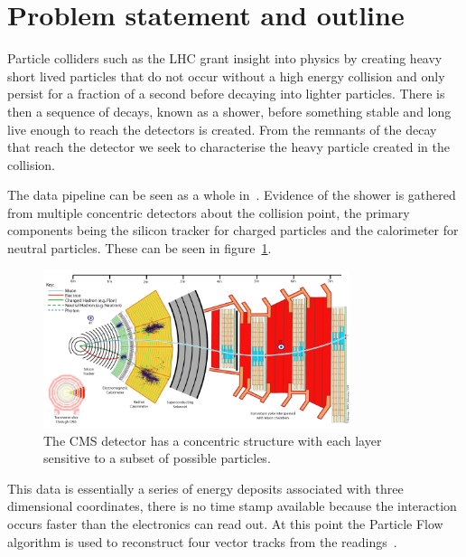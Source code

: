 \section{Problem statement and outline}
Particle colliders such as the LHC grant insight into physics by
creating heavy short lived particles that do not occur without a high energy collision
and only persist for a fraction of a second before decaying into lighter particles.
There is then a sequence of decays, known as a shower, before something
stable and long live enough to reach the detectors is created.
From the remnants of the decay that reach the detector we seek
to characterise the heavy particle created in the collision.

The data pipeline can be seen as a whole in~\cite{Stoye_DeepCMS2018, Schramm:2291608}.
Evidence of the shower is gathered from multiple concentric detectors about the collision point, the primary components being the 
silicon tracker for charged particles and the calorimeter for neutral particles. 
These can be seen in figure~\ref{fig:lit_CMSdetector}.
\begin{figure}
    \centering
    \includegraphics[width=0.8\textwidth]{images/lit_CMSdetector.png}
    \caption{The CMS detector has a concentric structure with each layer sensitive to a subset of possible particles.
             \cite{Stoye_DeepCMS2018}}
    \label{fig:lit_CMSdetector}
\end{figure}
This data is essentially a series of energy deposits associated with three dimensional coordinates,
there is no time stamp available because the interaction occurs faster than the electronics can read out.
At this point the Particle Flow algorithm is used to reconstruct four vector tracks from the readings~\cite{Beaudette_particleFlow2013}.

